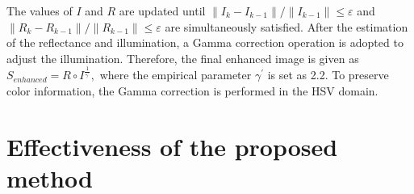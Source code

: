The values of $I$ and $R$ are updated until $\|I_{k}-I_{k-1}\|/\|I_{k-1}\| \leq \varepsilon$ and $\|R_{k}-R_{k-1}\|/\|R_{k-1}\| \leq \varepsilon$ are simultaneously satisfied. After the estimation of  the reflectance and illumination, a Gamma correction operation is adopted to adjust the illumination. Therefore, the final enhanced image is given as $ S_{enhanced} = R \circ I^{\frac{1}{\gamma^{'}}}, \label{eq_final}$ where the empirical parameter $\gamma^{'}$ is set as 2.2. To preserve color information, the Gamma correction is performed in the HSV domain.
\section{Effectiveness of the proposed method} \label{sec:analysis}